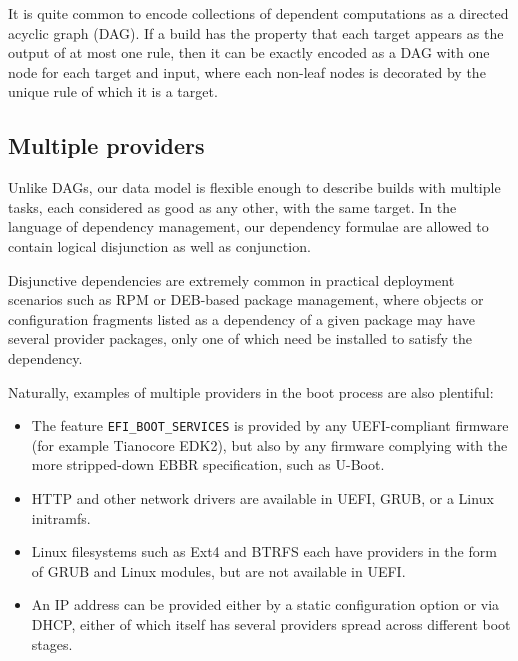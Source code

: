 \begin{example} 
  
  It is quite common to encode collections of dependent computations as a directed acyclic graph (DAG).
  If a build has the property that each target appears as the output of at most one rule, then it can be exactly encoded as a DAG with one node for each target and input, where each non-leaf nodes is decorated by the unique rule of which it is a target.

\end{example}

\subsection{Multiple providers}

Unlike DAGs, our data model is flexible enough to describe builds with multiple tasks, each considered as good as any other, with the same target.
%
In the language of dependency management, our dependency formulae are allowed to contain logical disjunction as well as conjunction.

Disjunctive dependencies are extremely common in practical deployment scenarios such as RPM or DEB-based package management, where objects or configuration fragments listed as a dependency of a given package may have several provider packages, only one of which need be installed to satisfy the dependency.

Naturally, examples of multiple providers in the boot process are also plentiful:

\begin{itemize}
\tightlist
\item
  The feature \texttt{EFI\_BOOT\_SERVICES} is provided by any
  UEFI-compliant firmware (for example Tianocore EDK2), but also by any
  firmware complying with the more stripped-down EBBR specification,
  such as U-Boot.
\item
  HTTP and other network drivers are available in UEFI, GRUB, or a Linux
  initramfs.
\item
  Linux filesystems such as Ext4 and BTRFS each have providers in the
  form of GRUB and Linux modules, but are not available in UEFI.
\item
  An IP address can be provided either by a static configuration option
  or via DHCP, either of which itself has several providers spread
  across different boot stages.
\end{itemize}


